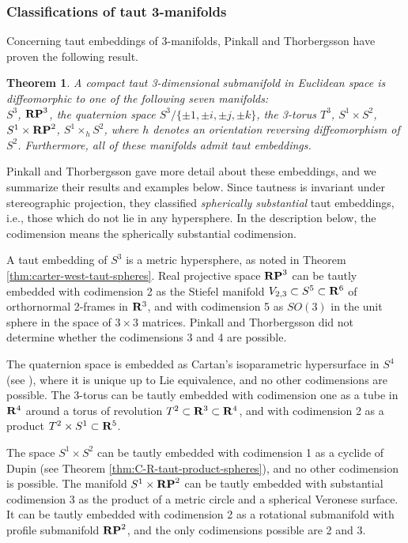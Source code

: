 \documentclass[12pt]{article}
\newtheorem{theorem}{Theorem}[section]
\begin{document}
{\subsubsection*{Classifications of taut 3-manifolds}


Concerning taut embeddings of 3-manifolds, Pinkall and
Thorbergsson \cite{PT1} have proven the following result.
\begin{theorem}
\label{thm-Pinkall-Thorb-3d}
A compact taut 3-dimensional submanifold in Euclidean space
is diffeomorphic to one of the following seven manifolds:\\
$S^3$, ${\bf RP}^3$, the quaternion space $S^3/\{\pm 1, \pm i,
\pm j, \pm k\}$, the 3-torus $T^3$,
$S^1 \times S^2$, $S^1 \times {\bf RP}^2$,
$S^1 \times_h S^2$, where $h$ denotes an orientation reversing
diffeomorphism of $S^2$.
Furthermore, all of these manifolds admit taut embeddings.
\end{theorem}
Pinkall and Thorbergsson \cite{PT1} gave more detail about these embeddings,
and we summarize their results and examples below.
Since tautness is invariant under stereographic projection, they
classified {\em spherically substantial} taut embeddings, i.e.,
those which do not lie in any hypersphere.  In the description below,
the codimension means the spherically substantial
codimension.

A taut embedding of $S^3$ is a metric hypersphere, as noted in Theorem \ref{thm:carter-west-taut-spheres}. Real 
projective space  ${\bf RP}^3$
can be tautly embedded with codimension 2 as the Stiefel
manifold $V_{2,3} \subset S^5 \subset {\bf R}^6$ of orthornormal 2-frames in ${\bf R}^3$,
and with
codimension 5 as $SO(3)$ in the unit sphere in the space
of $3 \times 3$ matrices.  Pinkall and Thorbergsson did not determine whether the codimensions
3 and 4 are possible.  

The quaternion space is embedded as
Cartan's isoparametric hypersurface in $S^4$ (see \cite[pp. 151--155]{CR8}), where it is unique
up to Lie equivalence, and no other codimensions are possible.
The 3-torus can be tautly embedded with codimension one as a
tube in ${\bf R}^4$ around a torus of revolution 
$T^2 \subset {\bf R}^3 \subset {\bf R}^4$, and with codimension 2 as a product
$T^2 \times S^1 \subset {\bf R}^5$. 

The space $S^1 \times S^2$ can be tautly embedded
with codimension 1
as a cyclide of Dupin (see Theorem \ref{thm:C-R-taut-product-spheres}), and no other codimension
is possible.  The manifold  $S^1 \times {\bf RP}^2$ can be
tautly embedded with substantial codimension 3 as the product of a 
metric circle and a spherical Veronese surface. It can be tautly
embedded with codimension 2 as a rotational
submanifold with profile submanifold  ${\bf RP}^2$, 
and the only codimensions
possible are 2 and 3.  

}
\end{document}
